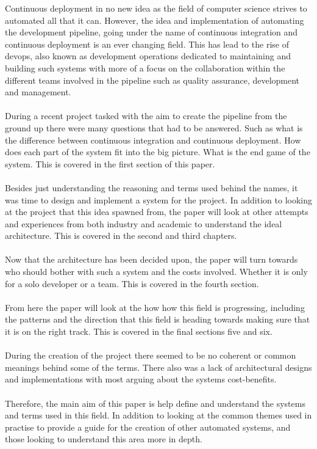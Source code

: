 Continuous deployment in no new idea as the field of computer science strives to automated all that it can. However, the idea and implementation of automating the development pipeline, going under the name of continuous integration and continuous deployment is an ever changing field. This has lead to the rise of devops, also known as development operations dedicated to maintaining and building such systems with more of a focus on the collaboration within the different teams involved in the pipeline such as quality assurance, development and management.
\\\\
During a recent project tasked with the aim to create the pipeline from the ground up there were many questions that had to be answered. Such as what is the difference between continuous integration and continuous deployment. How does each part of the system fit into the big picture. What is the end game of the system. This is covered in the first section of this paper.
\\\\
Besides just understanding the reasoning and terms used behind the names, it was time to design and implement a system for the project. In addition to looking at the project that this idea spawned from, the paper will look at other attempts and experiences from both industry and academic to understand the ideal architecture. This is covered in the second and third chapters.
\\\\
Now that the architecture has been decided upon, the paper will turn towards who should bother with such a system and the costs involved. Whether it is only for a solo developer or a team. This is covered in the fourth section.
\\\\
From here the paper will look at the how how this field is progressing, including the patterns and the direction that this field is heading towards making sure that it is on the right track. This is covered in the final sections five and six.
\\\\
During the creation of the project there seemed to be no coherent or common meanings behind some of the terms. There also was a lack of architectural designs and implementations with most arguing about the systems cost-benefits.
\\\\
Therefore, the main aim of this paper is help define and understand the systems and terms used in this field. In addition to looking at the common themes used in practise to provide a guide for the creation of other automated systems, and those looking to understand this area more in depth.
